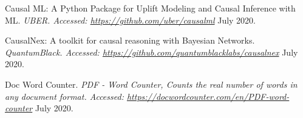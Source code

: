 \begin{thebibliography}{1}
 Causal ML: A Python Package for Uplift Modeling and Causal Inference with ML. {\em UBER. Accessed:  \url{https://github.com/uber/causalml}} July 2020.

 CausalNex: A toolkit for causal reasoning with Bayesian Networks. {\em QuantumBlack. Accessed:  \url{https://github.com/quantumblacklabs/causalnex}} July 2020.

 Doc Word Counter. {\em 	PDF - Word Counter, Counts the real number of words in any document format. Accessed:  \url{https://docwordcounter.com/en/PDF-word-counter}} July 2020.

\end{thebibliography}